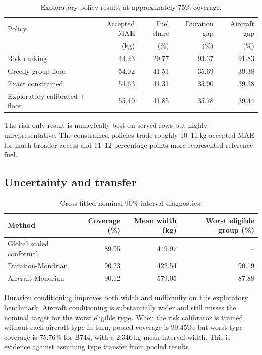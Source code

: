 \documentclass[11pt]{article}
\begin{document}
\begin{table}[ht]
\centering
\caption{Exploratory policy results at approximately 75\% coverage.}
\label{tab:policy}
\begin{tabular}{lrrrr}
\toprule
Policy & Accepted MAE & Fuel share & Duration gap & Aircraft gap\\
 & (kg) & (\%) & (\%) & (\%)\\
\midrule
Risk ranking & 44.23 & 29.77 & 93.37 & 91.83\\
Greedy group floor & 54.02 & 41.51 & 35.69 & 39.38\\
Exact constrained & 54.63 & 41.31 & 35.90 & 39.38\\
Exploratory calibrated + floor & 55.40 & 41.85 & 35.78 & 39.44\\
\bottomrule
\end{tabular}
\end{table}

The risk-only result is numerically best on served rows but highly unrepresentative. The constrained policies trade roughly 10--11\,kg accepted MAE for much broader access and 11--12 percentage points more represented reference fuel.

\subsection{Uncertainty and transfer}
\begin{table}[ht]
\centering
\caption{Cross-fitted nominal 90\% interval diagnostics.}
\begin{tabular}{lrrr}
\toprule
Method & Coverage (\%) & Mean width (kg) & Worst eligible group (\%)\\
\midrule
Global scaled conformal & 89.95 & 449.97 & --\\
Duration-Mondrian & 90.23 & 422.54 & 90.19\\
Aircraft-Mondrian & 90.12 & 579.05 & 87.88\\
\bottomrule
\end{tabular}
\end{table}

Duration conditioning improves both width and uniformity on this exploratory benchmark. Aircraft conditioning is substantially wider and still misses the nominal target for the worst eligible type. When the risk calibrator is trained without each aircraft type in turn, pooled coverage is 90.45\%, but worst-type coverage is 75.76\% for B744, with a 2,346\,kg mean interval width. This is evidence against assuming type transfer from pooled results.
\end{document}

